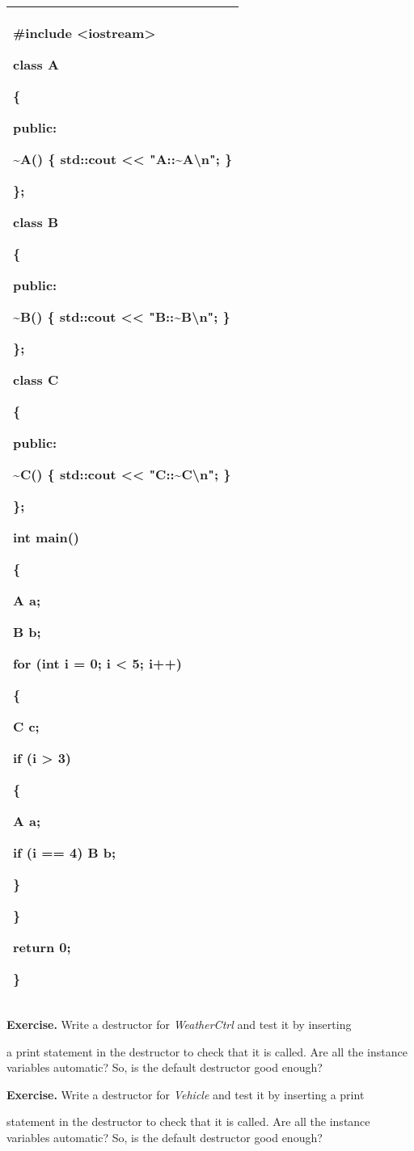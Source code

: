 \documentclass[
]{article}
\begin{document}
\begin{longtable}[]{@{}l@{}}
\toprule
\endhead
\begin{minipage}[t]{0.97\columnwidth}\raggedright
\#include \textless iostream\textgreater{}

class A

\{

public:

\textasciitilde A() \{ std::cout \textless\textless{}
"A::\textasciitilde A\textbackslash n"; \}

\};

class B

\{

public:

\textasciitilde B() \{ std::cout \textless\textless{}
"B::\textasciitilde B\textbackslash n"; \}

\};

class C

\{

public:

\textasciitilde C() \{ std::cout \textless\textless{}
"C::\textasciitilde C\textbackslash n"; \}

\};

int main()

\{

A a;

B b;

for (int i = 0; i \textless{} 5; i++)

\{

C c;

if (i \textgreater{} 3)

\{

A a;

if (i == 4) B b;

\}

\}

return 0;

\}\strut
\end{minipage}\tabularnewline
\bottomrule
\end{longtable}

\textbf{Exercise.} Write a destructor for \emph{WeatherCtrl} and test it
by inserting

a print statement in the destructor to check that it is called. Are all
the instance variables automatic? So, is the default destructor good
enough?

\textbf{Exercise.} Write a destructor for \emph{Vehicle} and test it by
inserting a print

statement in the destructor to check that it is called. Are all the
instance variables automatic? So, is the default destructor good enough?
\end{document}
